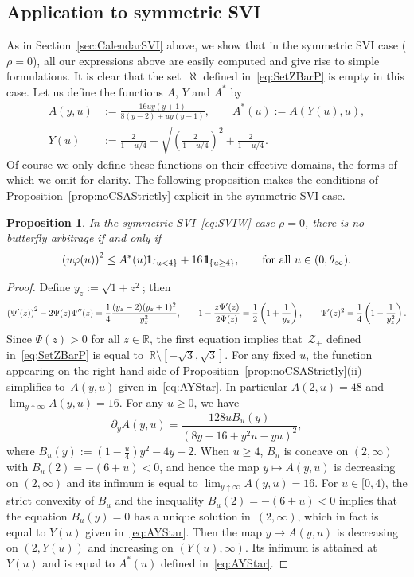 \documentclass{amsart}[11pt]
\numberwithin{equation}{section}
\newtheorem{proposition}[theorem]{Proposition}
\theoremstyle{definition}
\newcommand{\ind}{1\hspace{-2.1mm}{1}}
\newcommand{\RR}{\mathbb{R}}
\newcommand{\Zz}{\mathcal{Z}}
\begin{document}
\subsection{Application to symmetric SVI}\label{sec:ApplicationSVI}
As in Section~\ref{sec:CalendarSVI} above, we show that in the symmetric SVI case ($\rho=0$), 
all our expressions above are easily computed and give rise to simple formulations.
It is clear that the set~$\aleph$ defined in~\eqref{eq:SetZBarP} is empty in this case.
Let us define the functions $A$, $Y$ and $A^*$ by
\begin{equation}\label{eq:AYStar}
\begin{array}{rl}
A(y, u) & := \displaystyle \frac{16 uy(y+1)}{8(y-2) + uy(y-1)},
\qquad
A^*(u) := A(Y(u), u),\\
Y(u) & := \displaystyle \frac{2}{1-u/4} +\sqrt{\left (\frac{2}{1-u/4}\right)^2 + \frac{2}{1-u/4}}.
\end{array}
\end{equation}
Of course we only define these functions on their effective domains, the forms of which we omit for clarity.
The following proposition makes the conditions of Proposition~\ref{prop:noCSAStrictly} explicit in the symmetric SVI case.
\begin{proposition}
In the symmetric SVI~\eqref{eq:SVIW} case $\rho=0$, there is no butterfly arbitrage if and only if
$$
\left(u \varphi(u)\right)^2 \leq A^*(u) \ind_{\{u<4\}}+ 16\, \ind_{\{u\geq4\}},
\qquad\text{for all }u \in (0, \theta_\infty).$$
\end{proposition}
\begin{proof}
Define $y_z:= \sqrt{1+z^2}$; then
$$
\left(\Psi'(z)\right)^2-2 \Psi(z) \Psi''(z) = \frac{1}{4} \frac{(y_z-2)(y_z+1)^2}{y_z^3},
\qquad
1-\frac{z \Psi'(z)}{2 \Psi(z)} = \frac{1}{2}\left(1+\frac{1}{y_z}\right),\\
\qquad
\Psi'(z)^2 = \frac{1}{4}\left(1 - \frac{1}{y_z^2}\right).
$$
Since $\Psi(z)>0$ for all $z\in\mathbb{R}$, the first equation implies that~$\overline{\Zz}_+$ defined in~\eqref{eq:SetZBarP} is equal to~$\RR\setminus [-\sqrt{3},\sqrt{3}]$. 
For any fixed $u$, the function appearing on the right-hand side of Proposition~\ref{prop:noCSAStrictly}(ii) 
simplifies to~$A(y, u)$ given in~\eqref{eq:AYStar}.
In particular
$A(2,u)=48$ and $\lim_{y\uparrow\infty}A(y,u)=16$.
For any $u\geq 0$, we have
$$
\partial_y A(y,u) = \frac{128 u B_u(y)}{\left(8y-16+y^2 u-yu\right)^2},
$$
where $B_u(y):=\left(1-\frac{u}{4}\right) y^2 -4 y-2$.
When $u\geq 4$, $B_u$ is concave on $(2,\infty)$ with $B_u(2)=-(6+u)<0$, and hence
the map $y\mapsto A(y,u)$ is decreasing on $(2,\infty)$ and its infimum is equal to
$\lim_{y\uparrow\infty}A(y,u)=16$.
For $u\in[0,4)$, the strict convexity of $B_u$ and the inequality $B_u(2) = -(6+u)<0$ implies that 
the equation $B_u(y)=0$ has a unique solution in~$(2,\infty)$, which in fact is equal to $Y(u)$ given in~\eqref{eq:AYStar}.
Then the map $y\mapsto A(y,u)$ is decreasing on $(2,Y(u))$ and increasing on $(Y(u),\infty)$.
Its infimum is attained at~$Y(u)$ and is equal to $A^*(u)$ defined in~\eqref{eq:AYStar}.
\end{proof}
\end{document}

